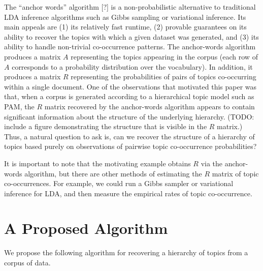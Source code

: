 \documentclass{article}
\theoremstyle{definition}
\newcommand{\TODOcite}{[?]}
\begin{document}
The ``anchor words'' algorithm \TODOcite{} is a non-probabilistic alternative to traditional LDA inference algorithms such as Gibbs sampling or variational inference.
Its main appeals are (1) its relatively fast runtime, (2) provable guarantees on its ability to recover the topics with which a given dataset was generated, and (3) its ability to handle non-trivial co-occurrence patterns.
The anchor-words algorithm produces a matrix $A$ representing the topics appearing in the corpus (each row of $A$ corresponds to a probability distribution over the vocabulary).
In addition, it produces a matrix $R$ representing the probabilities of pairs of topics co-occurring within a single document.
One of the observations that motivated this paper was that, when a corpus is generated according to a hierarchical topic model such as PAM, the $R$ matrix recovered by the anchor-words algorithm appears to contain significant information about the structure of the underlying hierarchy.
(TODO: include a figure demonstrating the structure that is visible in the $R$ matrix.)
Thus, a natural question to ask is, can we recover the structure of a hierarchy of topics based purely on observations of pairwise topic co-occurrence probabilities?

It is important to note that the motivating example obtains $R$ via the anchor-words algorithm, but there are other methods of estimating the $R$ matrix of topic co-occurrences.
For example, we could run a Gibbs sampler or variational inference for LDA, and then measure the empirical rates of topic co-occurrence.

\section{A Proposed Algorithm}

We propose the following algorithm for recovering a hierarchy of topics from a corpus of data.

\newcommand{\Rbar}{\overline{R}}
\end{document}
